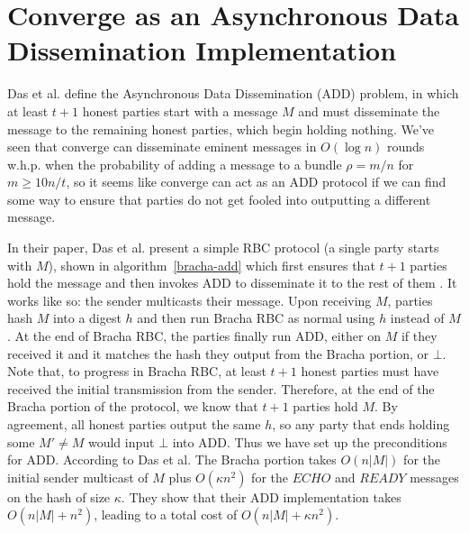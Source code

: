 \documentclass{article}
\begin{document}
\section{Converge as an Asynchronous Data Dissemination Implementation}
Das et al. \cite{das2021add} define the Asynchronous Data Dissemination (ADD) problem, in which at least $t+1$ honest parties start with a message $M$ and must disseminate the message to the remaining honest parties, which begin holding nothing. We've seen that converge can disseminate eminent messages in $O(\log n)$ rounds w.h.p. when the probability of adding a message to a bundle $\rho = m/n$ for $m \geq 10n/t$, so it seems like converge can act as an ADD protocol if we can find some way to ensure that parties do not get fooled into outputting a different message. 

In their paper, Das et al. present a simple RBC protocol (a single party starts with $M$), shown in algorithm~\ref{bracha-add} which first ensures that $t+1$ parties hold the message and then invokes ADD to disseminate it to the rest of them \cite{das2021add}. It works like so: the sender multicasts their message. Upon receiving $M$, parties hash $M$ into a digest $h$ and then run Bracha RBC as normal using $h$ instead of $M$. At the end of Bracha RBC, the parties finally run ADD, either on $M$ if they received it and it matches the hash they output from the Bracha portion, or $\bot$. Note that, to progress in Bracha RBC, at least $t+1$ honest parties must have received the initial transmission from the sender. Therefore, at the end of the Bracha portion of the protocol, we know that $t+1$ parties hold $M$. By agreement, all honest parties output the same $h$, so any party that ends holding some $M' \neq M$ would input $\bot$ into ADD. Thus we have set up the preconditions for ADD. According to Das et al. The Bracha portion takes $O(n|M|)$ for the initial sender multicast of $M$ plus $O(\kappa n^2)$ for the $ECHO$ and $READY$ messages on the hash of size $\kappa$. They show that their ADD implementation takes $O(n|M| + n^2)$, leading to a total cost of $O(n|M| + \kappa n^2)$.
\end{document}
